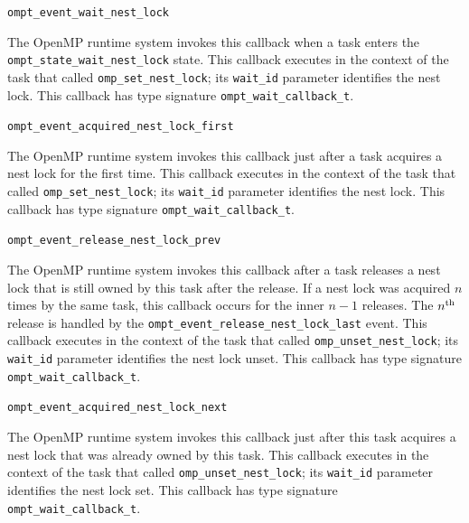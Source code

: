 \documentclass{article}
\newcommand{\descheader}[1]{{\needspace{3\baselineskip}\vspace{1em}\noindent \fbox{#1}}}
\begin{document}
\begin{description}

\item \verb|ompt_event_wait_nest_lock|
 
   The OpenMP runtime system invokes this callback when a task
   enters the \verb|ompt_state_wait_nest_lock|
   state.  This callback executes in the context of the task that called \verb|omp_set_nest_lock|;   
   its \verb|wait_id| parameter identifies the nest lock.
   This callback has type signature \verb|ompt_wait_callback_t|. 

\item \verb|ompt_event_acquired_nest_lock_first| 
 
   The OpenMP runtime system invokes this callback just after a
   task acquires a nest lock for the first time.  This callback
   executes in the context of the task that called \verb|omp_set_nest_lock|; its \verb|wait_id| parameter
   identifies the nest lock.
   This callback has type signature \verb|ompt_wait_callback_t|. 


\item \verb|ompt_event_release_nest_lock_prev|
 
 \sloppy
   The OpenMP runtime system invokes this callback after a task releases a nest lock that 
   is still owned by this task after the release. If a nest lock
   was acquired $n$ times by the same task, this callback occurs for
   the inner $n-1$ releases.  The $n^{\rm th}$ release is handled by the
   \verb|ompt_event_release_nest_lock_last| event.  This callback executes
   in the context of the task that called \verb|omp_unset_nest_lock|; its \verb|wait_id| parameter identifies
   the nest lock unset.
   This callback has type signature \verb|ompt_wait_callback_t|. 

\item \verb|ompt_event_acquired_nest_lock_next|
 
   The OpenMP runtime system invokes this callback just after this
   task acquires a nest lock that was already owned by this task.
   This callback executes in the context of the task that called \verb|omp_unset_nest_lock|; its
   \verb|wait_id| parameter identifies the nest lock set.
   This callback  has type signature \verb|ompt_wait_callback_t|. 

\end{description}

\descheader{Critical Sections}
\end{document}
